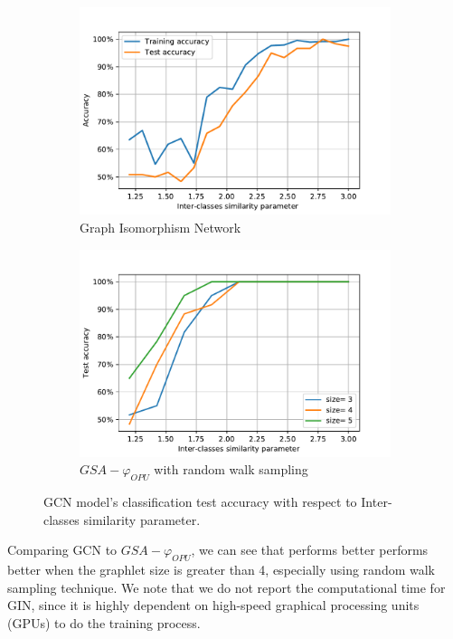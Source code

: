 \begin{figure}[h]
\centering
     \begin{subfigure}[b]{0.49\textwidth}
         \centering
         \includegraphics[width=\textwidth]{figs/GCN.pdf}
         \caption{Graph Isomorphism Network}
         \label{subfig:GIN}
     \end{subfigure}
     \hfill
     \begin{subfigure}[b]{0.49\textwidth}
         \centering
         \includegraphics[width=\textwidth]{figs/LightOn_adj_SBM_similarity_graphlet_size_RW.pdf}
         \caption{$GSA-\varphi_{OPU}$ with random walk sampling}
         \label{subfig:GSAvsGIN}
     \end{subfigure}
\caption[GCN model's classification test accuracy as a function of Inter-classes similarity parameter ]{GCN model's classification test accuracy with respect to Inter-classes similarity parameter.}
\label{fig:GCN_GIN_SBM_multfactor_RW}
\end{figure}
Comparing GCN to $GSA-\varphi_{OPU}$, we can see that performs better performs better when the graphlet size is greater than 4, especially using  random walk sampling technique. We note that we do not report the computational time for GIN, since it is highly dependent on high-speed graphical processing units (GPUs) to do the training process. %

